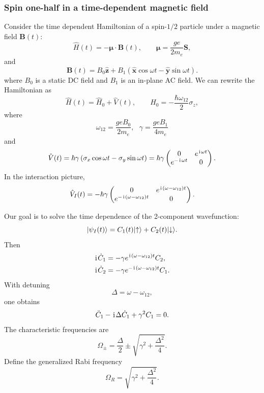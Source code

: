 \subsubsection{Spin one-half in a time-dependent magnetic field}
Consider the time dependent Hamiltonian of a spin-$1/2$ particle under a magnetic field ${\bm B(t)}$:
\begin{equation}
 \hat H(t)=-\bm\mu\cdot\bm B(t),
 \qquad
 \bm\mu=\frac{ge}{2m_e}\bm S,
\end{equation}
and
\begin{equation}
 \bm B(t)=B_0\hat{\bm z}
 +B_1\left(\hat{\bm x}\cos\omega t
 -\hat{\bm y}\sin\omega t\right).
\end{equation}
where $B_0$ is a static DC field and $B_1$ is an in-plane AC field. We can rewrite the Hamiltonian as 
\begin{equation}
 \hat H(t)=\hat H_0+\hat V(t),
 \qquad
 \hat H_0=-\frac{\hbar\omega_{12}}{2}\sigma_z,
\end{equation}
where
\begin{equation}
 \omega_{12}=\frac{geB_0}{2m_e},~~~\gamma=\frac{geB_1}{4m_e}
\end{equation}
and
\begin{equation}
 \hat V(t)=\hbar\gamma
 \left(\sigma_x\cos\omega t-\sigma_y\sin\omega t\right)
 =\hbar\gamma
 \begin{pmatrix}
 0&e^{\hspace{1pt}\mathrm{i}\hspace{1pt}\omega t}\\
 e^{-\hspace{1pt}\mathrm{i}\hspace{1pt}\omega t}&0
 \end{pmatrix}.
\end{equation}
In the interaction picture,
\begin{equation}
 \hat V_I(t)=-\hbar\gamma
 \begin{pmatrix}
 0&e^{\hspace{1pt}\mathrm{i}\hspace{1pt}(\omega-\omega_{12})t}\\
 e^{-\hspace{1pt}\mathrm{i}\hspace{1pt}(\omega-\omega_{12})t}&0
 \end{pmatrix}.
\end{equation}

Our goal is to solve the time dependence of the 2-component wavefunction:
\begin{equation}
 |{\psi_I(t)}\rangle
 =C_1(t)|{\uparrow}\rangle+C_2(t)|{\downarrow}\rangle.
\end{equation}
Then
\begin{align}
 \hspace{1pt}\mathrm{i}\hspace{1pt}\dot C_1
 &=-\gamma e^{\hspace{1pt}\mathrm{i}\hspace{1pt}(\omega-\omega_{12})t}C_2,\\
 \hspace{1pt}\mathrm{i}\hspace{1pt}\dot C_2
 &=-\gamma e^{-\hspace{1pt}\mathrm{i}\hspace{1pt}(\omega-\omega_{12})t}C_1.
\end{align}
With detuning
\begin{equation}
 \Delta=\omega-\omega_{12},
\end{equation}
one obtains
\begin{equation}
 \ddot C_1-\hspace{1pt}\mathrm{i}\hspace{1pt}\Delta\dot C_1+\gamma^2C_1=0.
\end{equation}
The characteristic frequencies are
\begin{equation}
 \Omega_\pm
 =\frac{\Delta}{2}
 \pm\sqrt{\gamma^2+\frac{\Delta^2}{4}}.
\end{equation}
Define the generalized Rabi frequency
\begin{equation}
 \boxed{\Omega_R=\sqrt{\gamma^2+\frac{\Delta^2}{4}}.}
\end{equation}

